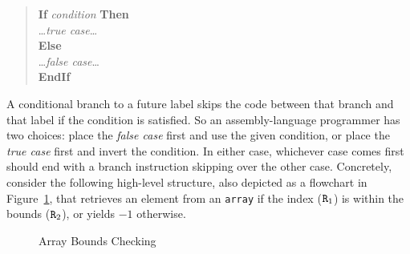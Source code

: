 \documentclass[12pt,english]{book}
\newcommand*{\asmstyle}{\noindent\ttfamily\selectfont\small}
\begin{document}
\begin{quote}\asmstyle
\null\textbf{If} \textit{condition} \textbf{Then}\\
\null\qquad \dots\textit{true case}\dots\\
\null\textbf{Else}\\
\null\qquad \dots\textit{false case}\dots\\
\null\textbf{EndIf}
\end{quote}

A conditional branch to a future label
skips the code between that branch and that label
if the condition is satisfied.
So an assembly-language programmer has two choices:
place the \textit{false case} first and use the given condition,
or place the \textit{true case} first and invert the condition.
In either case, whichever case comes first
should end with a branch instruction skipping over the other case.
Concretely, consider the following high-level structure,
also depicted as a flowchart in Figure~\ref{fig:if-fc},
that retrieves an element from an \texttt{array}
if the index (\(\text{\texttt{R}}_1\))
is within the bounds (\(\text{\texttt{R}}_2\)),
or yields \(-1\) otherwise.

\begin{figure}[ht!]\centering
  \caption{Array Bounds Checking}
  \label{fig:if-fc}
\end{figure}
\end{document}
